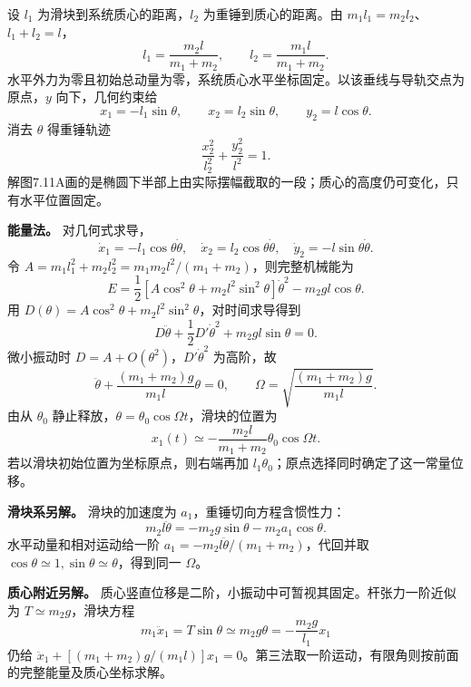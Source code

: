 \documentclass[UTF8,fontset=fandol,a4paper,11pt]{ctexart}
\newcommand{\figcaption}[1]{\par\vspace{2pt}{\small\color{muted}#1}\par}
\begin{document}
\begin{center}\begin{minipage}{\linewidth}\centering{}\figcaption{解图 7.11A}\end{minipage}\end{center}
设 $l_1$ 为滑块到系统质心的距离，$l_2$ 为重锤到质心的距离。由 $m_1l_1=m_2l_2$、$l_1+l_2=l$，
\[l_1=\frac{m_2l}{m_1+m_2},\qquad l_2=\frac{m_1l}{m_1+m_2}.\]
水平外力为零且初始总动量为零，系统质心水平坐标固定。以该垂线与导轨交点为原点，$y$ 向下，几何约束给
\[x_1=-l_1\sin\theta,\qquad x_2=l_2\sin\theta,\qquad y_2=l\cos\theta.\]
消去 $\theta$ 得重锤轨迹
\[\boxed{\frac{x_2^2}{l_2^2}+\frac{y_2^2}{l^2}=1.}\]
解图7.11A画的是椭圆下半部上由实际摆幅截取的一段；质心的高度仍可变化，只有水平位置固定。
\par\textbf{能量法。} 对几何式求导，
\[\dot x_1=-l_1\cos\theta\dot\theta,\quad
\dot x_2=l_2\cos\theta\dot\theta,\quad
\dot y_2=-l\sin\theta\dot\theta.\]
令 $A=m_1l_1^2+m_2l_2^2=m_1m_2l^2/(m_1+m_2)$，则完整机械能为
\[E=\frac12[A\cos^2\theta+m_2l^2\sin^2\theta]\dot\theta^2
-m_2gl\cos\theta.\]
用 $D(\theta)=A\cos^2\theta+m_2l^2\sin^2\theta$，对时间求导得到
\[D\ddot\theta+\frac12D'\dot\theta^2+m_2gl\sin\theta=0.\]
微小振动时 $D=A+O(\theta^2)$，$D'\dot\theta^2$ 为高阶，故
\[\ddot\theta+\frac{(m_1+m_2)g}{m_1l}\theta=0,\qquad
\Omega=\sqrt{\frac{(m_1+m_2)g}{m_1l}}.\]
由从 $\theta_0$ 静止释放，$\theta=\theta_0\cos\Omega t$，滑块的位置为
\[\boxed{x_1(t)\simeq-\frac{m_2l}{m_1+m_2}\theta_0\cos\Omega t.}\]
若以滑块初始位置为坐标原点，则右端再加 $l_1\theta_0$；原点选择同时确定了这一常量位移。
\par\textbf{滑块系另解。} 滑块的加速度为 $a_1$，重锤切向方程含惯性力：
\[m_2l\ddot\theta=-m_2g\sin\theta-m_2a_1\cos\theta.\]
水平动量和相对运动给一阶 $a_1=-m_2l\ddot\theta/(m_1+m_2)$，代回并取 $\cos\theta\simeq1,\sin\theta\simeq\theta$，得到同一 $\Omega$。
\par{}\textbf{质心附近另解。} 质心竖直位移是二阶，小振动中可暂视其固定。杆张力一阶近似为 $T\simeq m_2g$，滑块方程
\[m_1\ddot x_1=T\sin\theta\simeq m_2g\theta
=-\frac{m_2g}{l_1}x_1\]
仍给 $\ddot x_1+[(m_1+m_2)g/(m_1l)]x_1=0$。第三法取一阶运动，有限角则按前面的完整能量及质心坐标求解。
\end{document}
